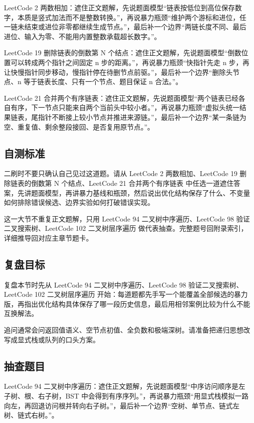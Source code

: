 LeetCode 2 两数相加：遮住正文题解，先说题面模型“链表按低位到高位保存数字，本质是竖式加法而不是整数转换。”，再说暴力瓶颈“维护两个游标和进位，任一链未结束或进位非零都继续生成节点。”，最后补一个边界“两链长度不同、最后进位、输入为零、不能用内置整数承载超长数字。”。

LeetCode 19 删除链表的倒数第 N 个结点：遮住正文题解，先说题面模型“倒数位置可以转成两个指针之间固定 n 步的距离。”，再说暴力瓶颈“快指针先走 n 步，再让快慢指针同步移动，慢指针停在待删节点前驱。”，最后补一个边界“删除头节点、n 等于链表长度、只有一个节点、题目保证 n 合法。”。

LeetCode 21 合并两个有序链表：遮住正文题解，先说题面模型“两个链表已经各自有序，下一节点只能来自两个当前头中较小者。”，再说暴力瓶颈“虚拟头统一结果链表，尾指针不断接上较小节点并推进来源链。”，最后补一个边界“某一条链为空、重复值、剩余整段接回、是否复用原节点。”。

\subsection{自测标准}

二刷时不要只确认自己见过这道题。请从 LeetCode 2 两数相加、LeetCode 19 删除链表的倒数第 N 个结点、LeetCode 21 合并两个有序链表 中任选一道遮住答案，先讲题面模型，再讲暴力基线和瓶颈，然后说出优化结构保存了什么、不变量如何排除错误候选、边界实验如何打破错误实现。

这一大节不重复正文题解，只用 LeetCode 94 二叉树中序遍历、LeetCode 98 验证二叉搜索树、LeetCode 102 二叉树层序遍历 做代表抽查。完整题号回附录索引，详细推导回对应主章节题卡。

\subsection{复盘目标}

复盘本节时先从 LeetCode 94 二叉树中序遍历、LeetCode 98 验证二叉搜索树、LeetCode 102 二叉树层序遍历 开始：每道题都先手写一个能覆盖全部候选的暴力版，再指出优化结构具体保存了哪一段历史信息，最后用相邻案例比较为什么不能互换解法。

追问通常会问返回值语义、空节点初值、全负数和极端深树。请准备把递归思想改写成显式栈或队列的口头方案。

\subsection{抽查题目}

LeetCode 94 二叉树中序遍历：遮住正文题解，先说题面模型“中序访问顺序是左子树、根、右子树，BST 中会得到有序序列。”，再说暴力瓶颈“用显式栈模拟一路向左，再回退访问根并转向右子树。”，最后补一个边界“空树、单节点、链式左树、链式右树。”。

